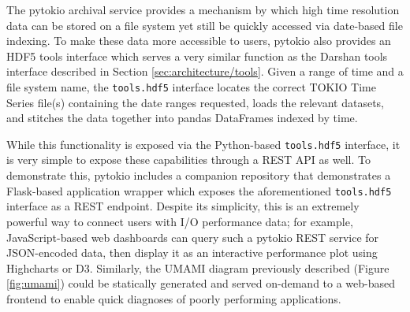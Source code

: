 The pytokio archival service provides a mechanism by which high time resolution data can be stored on a file system yet still be quickly accessed via date-based file indexing.
To make these data more accessible to users, pytokio also provides an HDF5 tools interface which serves a very similar function as the Darshan tools interface described in Section \ref{sec:architecture/tools}.
Given a range of time and a file system name, the \texttt{tools.hdf5} interface locates the correct TOKIO Time Series file(s) containing the date ranges requested, loads the relevant datasets, and stitches the data together into pandas DataFrames indexed by time.

While this functionality is exposed via the Python-based \texttt{tools.hdf5} interface, it is very simple to expose these capabilities through a REST API as well.
To demonstrate this, pytokio includes a companion repository that demonstrates a Flask-based application wrapper which exposes the aforementioned \texttt{tools.hdf5} interface as a REST endpoint.
Despite its simplicity, this is an extremely powerful way to connect users with I/O performance data;
for example, JavaScript-based web dashboards can query such a pytokio REST service for JSON-encoded data, then display it as an interactive performance plot using Highcharts or D3.
Similarly, the UMAMI diagram previously described (Figure \ref{fig:umami}) could be statically generated and served on-demand to a web-based frontend to enable quick diagnoses of poorly performing applications.